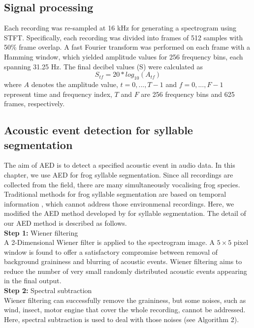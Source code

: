 \subsection{Signal processing}
Each recording was re-sampled at 16 kHz for generating a spectrogram using STFT. Specifically, each recording was divided into frames of 512 samples with 50\% frame overlap.
A fast Fourier transform was performed on each frame with a Hamming window, which yielded amplitude values for 256 frequency bins, each spanning 31.25 Hz. The final decibel values (S) were calculated as 
\begin{equation}
S_{tf} = 20*log_{10}(A_{tf})
\end{equation}
where $A$ denotes the amplitude value, $t=0,...,T-1$ and $f=0,...,F-1$ represent time and frequency index, $T$ and $F$ are 256 frequency bins and 625 frames, respectively. 

\subsection{Acoustic event detection for syllable segmentation}
\label{Ch5:AEDmethod}

The aim of AED is to detect a specified acoustic event in audio data. In this chapter, we use AED for frog syllable segmentation. Since all recordings are collected from the field, there are many simultaneously vocalising frog species. Traditional methods for frog syllable segmentation are based on temporal information \citep{somervuo2004classification,huang2009frog}, which cannot address those environmenal recordings. Here, we modified the AED method developed by  \cite{towsey2012toolbox} for syllable segmentation. The detail of our AED method is described as follows.
\\
\textbf{Step 1:} Wiener filtering 
\noindent
\\
A 2-Dimensional Wiener filter is applied to the spectrogram image. A $5\times5$ pixel window is found to offer a satisfactory compromise between removal of background graininess and blurring of acoustic events. Wiener filtering aims to reduce the number of very small randomly distributed acoustic events appearing in the final output.
\\
\textbf{Step 2:} Spectral subtraction
\noindent 
\\
Wiener filtering can successfully remove the graininess, but some noises, such as wind, insect, motor engine that cover the whole recording, cannot be addressed. Here, spectral subtraction is used to deal with those noises (see Algorithm 2). 


